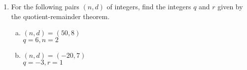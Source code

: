 \documentclass[12pt]{amsart}
\begin{document}
\begin{enumerate}[{\bfseries 1.}]
	\vspace{0.1in}
	\noindent
	(i.e. every integer that is greater than 8 can be expressed as a sum of 3's and 5's.)

	\begin{enumerate}[(a)]
	\vspace{0.1in}
	\item Verify the statement for $8\leq n\leq 13$.  Do you notice any pattern?
		\\$n = 8 = 3\cdot 1 + 5\cdot 1$
		\\$n = 9 = 3\cdot 3 + 5\cdot 0$
		\\$n = 10 = 3\cdot 0 + 5\cdot 2$
		\\$n = 11 = 3\cdot 2 + 5\cdot 1$
		\\$n = 12 = 3\cdot 4 + 5\cdot 0$
		\\$n = 13 = 3\cdot 1 + 5\cdot 2$
	\vspace{0.1in}
	\item Use strong mathematical induction to prove the statement.
		\begin{proof}
		\\We will prove by induction that, for every integer $n\geq 8$, $P(n)$: $n = 3a+5b$ where $a, b\in\mathbb{Z}$ and $a\geq0, b\geq0$ is true.
		\\\underline{Base cases}
		\\$8 = 3\cdot 1 + 5\cdot 1$, where $a = 1, b = 1$, so $P(8)$ is true.
		\\\underline{Induction step}
		\\Let $k\geq 8$ be an integer and suppose $P(8),...,P(k)$ are true. Because $P(k-2)$ is true, there exist $m,n\in\mathbb{Z}, m\geq 0, n\geq0$ such that $k-2=3m+5n$.
		\begin{align*}
	    k+1 &= (k-2) + 3\\
		&= 3m+5n+3 \text{ (by the induction hypothesis)} \\
		&= 3(m+1) + 5n
		\end{align*}
		where $m+1\geq 0, n\geq 0$.
		\end{proof}
		\vfill
		\vfill
	\end{enumerate}

\newpage
\item For the following pairs $(n, d)$ of integers, find the integers $q$ and $r$ given by the quotient-remainder theorem.

	\begin{enumerate}[(a)]
	\vspace{0.1in}
	\item $(n, d)=(50, 8)$
		\\$q = 6, n = 2$
	\vspace{0.1in}
	\item $(n, d)=(-20, 7)$
		\\$q = -3, r = 1$
	\end{enumerate}


\end{enumerate}
\end{document}
